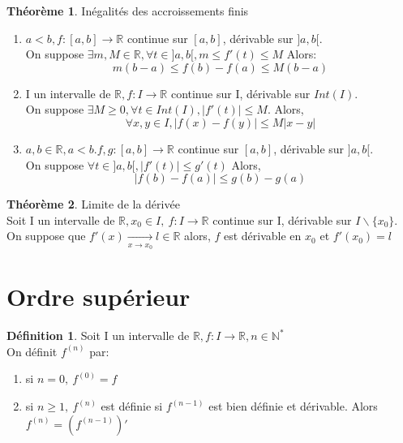 \documentclass[fleqn]{article}
\theoremstyle{definition} \newtheorem*{defi}{D\'efinition}
\theoremstyle{definition} \newtheorem*{theo}{Th\'eor\`eme}
\theoremstyle{remark} \newtheorem*{rqs}{Remarques}
\theoremstyle{definition} \newtheorem*{prop}{Propri\'et\'e}
\begin{document}
\begin{theo} In\'egalit\'es des accroissements finis
	\begin{enumerate}
		\item $a<b, f:[a,b] \rightarrow \mathbb{R}$ continue sur $[a,b]$, d\'erivable sur $]a,b[$.\\
			On suppose $\exists m,M \in \mathbb{R}, \forall t \in ]a,b[, m \leq f'(t) \leq M$ Alors:
			\[m(b-a) \leq f(b) - f(a) \leq M(b-a)\]
		\item I un intervalle de $\mathbb{R}, f:I \rightarrow \mathbb{R}$ continue sur I, d\'erivable sur $Int(I)$.\\
			On suppose $\exists M\geq 0, \forall t \in Int(I), |f'(t)| \leq M$. Alors,
			\[\forall x,y \in I, |f(x) - f(y)| \leq M|x-y|\]
		\item $a,b \in \mathbb{R}, a<b. f,g:[a,b] \rightarrow \mathbb{R}$ continue sur $[a,b]$, d\'erivable sur $]a,b[$.\\
			On suppose $\forall t \in ]a,b[, |f'(t)| \leq g'(t)$ Alors,
			\[|f(b) - f(a)| \leq g(b) - g(a)\]
	\end{enumerate}
\end{theo}

\begin{theo} Limite de la d\'eriv\'ee \\
	Soit I un intervalle de $\mathbb{R}, x_0 \in I,\ f:I\rightarrow \mathbb{R}$ continue sur I, d\'erivable sur $I\backslash\{x_0\}$.\\
	On suppose que $f'(x) \underset{x \rightarrow x_0}{\rightarrow} l \in \mathbb{R}$ alors, $f$ est d\'erivable en $x_0$ et $f'(x_0) = l$
\end{theo}

\section{Ordre sup\'erieur}
\begin{defi}
	Soit I un intervalle de $\mathbb{R}, f:I \rightarrow \mathbb{R}, n \in \mathbb{N}^{*}$ \\
	On d\'efinit $f^{(n)}$ par:
	\begin{enumerate}
		\item si $n = 0,\ f^{(0)} = f$
		\item si $n \geq 1,\ f^{(n)}$ est d\'efinie si $f^{(n-1)}$ est bien d\'efinie et d\'erivable. Alors $f^{(n)} = (f^{(n-1)})'$
	\end{enumerate}
\end{defi}
\end{document}
